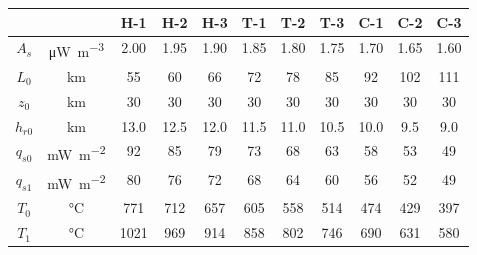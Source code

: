 \begin{tabular}{ccccccccccc}
\toprule
& & H-1 & H-2 & H-3 & T-1 & T-2 & T-3 & C-1 & C-2 & C-3 \\
\midrule
$A_{s}$ & \si{\uW\per\m\cubed} & 2.00 & 1.95 & 1.90 & 1.85 & 1.80 & 1.75 & 1.70 & 1.65 & 1.60 \\
$L_{0}$ & \si{\km} & 55 & 60 & 66 & 72 & 78 & 85 & 92 & 102 & 111 \\
$z_{0}$ & \si{\km} & 30 & 30 & 30 & 30 & 30 & 30 & 30 & 30 & 30 \\
$h_{r0}$ & \si{\km} & 13.0 & 12.5 & 12.0 & 11.5 & 11.0 & 10.5 & 10.0 & 9.5 & 9.0 \\
\midrule
$q_{s0}$ & \si{\mW\per\m\squared} & 92 & 85 & 79 & 73 & 68 & 63 & 58 & 53 & 49 \\
$q_{s1}$ & \si{\mW\per\m\squared} & 80 & 76 & 72 & 68 & 64 & 60 & 56 & 52 & 49 \\
$T_{0}$ & \si{\degreeCelsius} & 771 & 712 & 657 & 605 & 558 & 514 & 474 & 429 & 397 \\
$T_{1}$ & \si{\degreeCelsius} & 1021 & 969 & 914 & 858 & 802 & 746 & 690 & 631 & 580 \\
\bottomrule
\end{tabular}
